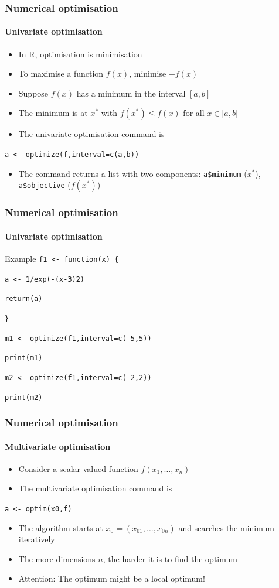 \documentclass[title={Introduction to R}, author={Mutschler and Zaharieva}, inst={Institute for Econometrics and Empirical Economics}]{beamer}
\begin{document}
\begin{frame}
\frametitle{Numerical optimisation}
\framesubtitle{Univariate optimisation}
\begin{itemize}
\item In R, optimisation is minimisation
\item To maximise a function $f(x)$, minimise $-f(x)$
\item Suppose $f(x)$ has a minimum in the interval $[a,b]$
\item The minimum is at $x^{\ast }$ with $f(x^{\ast })\leq f(x)$ for all $x\in \lbrack a,b]$
\item The univariate optimisation command is
\end{itemize}
\begin{center}
\texttt{a <- optimize(f,interval=c(a,b))}
\end{center}
\begin{itemize}
\item The command returns a list with two components: \newline
\texttt{a\$minimum} ($x^{\ast }$), \texttt{a\$objective} ($f(x^{\ast })$)
\end{itemize}
\end{frame}


\begin{frame}
\frametitle{Numerical optimisation}
\framesubtitle{Univariate optimisation}
\begin{block}{Example}
\texttt{f1 <- function(x) \{}

\quad \texttt{a <- 1/exp(-(x-3)2)}

\quad \texttt{return(a)}

\texttt{\}}

\texttt{m1 <- optimize(f1,interval=c(-5,5))}

\texttt{print(m1)}

\texttt{m2 <- optimize(f1,interval=c(-2,2))}

\texttt{print(m2)}
\end{block}
\end{frame}


\begin{frame}
\frametitle{Numerical optimisation}
\framesubtitle{Multivariate optimisation}
\begin{itemize}
\item Consider a scalar-valued function $f(x_{1},\ldots ,x_{n})$
\item The multivariate optimisation command is
\end{itemize}
\begin{center}
\texttt{a <- optim(x0,f)}
\end{center}
\begin{itemize}
\item The algorithm starts at $x_{0}=(x_{01},\ldots ,x_{0n})$ and searches the minimum iteratively
\item The more dimensions $n$, the harder it is to find the optimum
\item Attention: The optimum might be a local optimum!
\end{itemize}
\end{frame}
\end{document}
